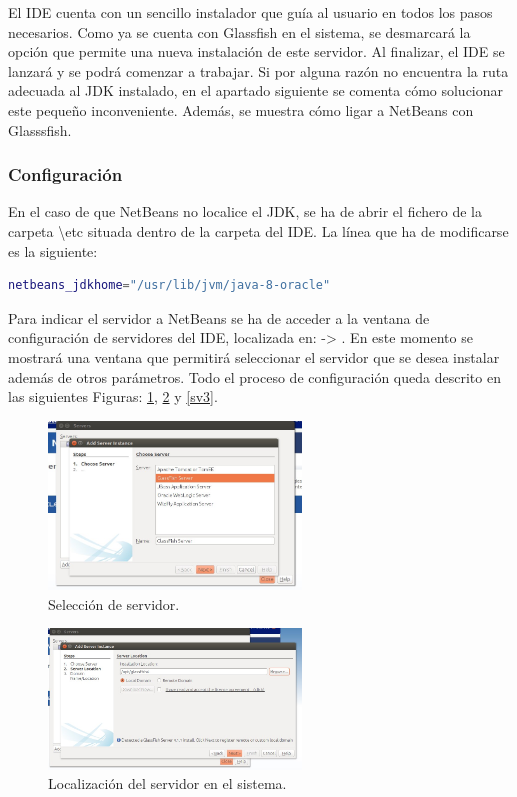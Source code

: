 El IDE cuenta con un sencillo instalador que guía al usuario en todos los pasos necesarios. Como ya se cuenta con Glassfish en el sistema, se desmarcará la opción que permite una nueva instalación de este servidor. Al finalizar, el IDE se lanzará y se podrá comenzar a trabajar. Si por alguna razón no encuentra la ruta adecuada al JDK instalado, en el apartado siguiente se comenta cómo solucionar este pequeño inconveniente. Además, se muestra cómo ligar a NetBeans con Glasssfish.

\subsubsection{Configuración}
En el caso de que NetBeans no localice el JDK, se ha de abrir el fichero  de la carpeta \textbackslash etc situada dentro de la carpeta del IDE. La línea que ha de modificarse es la siguiente:

\begin{lstlisting}[language=bash]
	netbeans_jdkhome="/usr/lib/jvm/java-8-oracle"
\end{lstlisting}

Para indicar el servidor a NetBeans se ha de acceder a la ventana de configuración de servidores del IDE, localizada en:  -> . En este momento se mostrará una ventana que permitirá seleccionar el servidor que se desea instalar además de otros parámetros. Todo el proceso de configuración queda descrito en las siguientes Figuras:  \ref{sv1}, \ref{sv2} y \ref{sv3}.

\begin{figure}[h]
  \centering
    \includegraphics[width=0.6\textwidth]{../img/instalacion/sv1.jpg}
  \caption{Selección de servidor.}
  \label{sv1}
\end{figure}

\begin{figure}[h]
  \centering
    \includegraphics[width=0.6\textwidth]{../img/instalacion/sv2.jpg}
  \caption{Localización del servidor en el sistema.}
  \label{sv2}
\end{figure}

